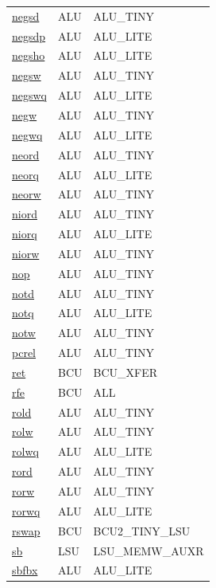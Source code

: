 \begin{small}
\begin{longtable}[l]{l l l}
\hyperlink{lvx.negsd}{negsd} & ALU & ALU\_TINY \\ 
\hyperlink{lvx.negsdp}{negsdp} & ALU & ALU\_LITE \\ 
\hyperlink{lvx.negsho}{negsho} & ALU & ALU\_LITE \\ 
\hyperlink{lvx.negsw}{negsw} & ALU & ALU\_TINY \\ 
\hyperlink{lvx.negswq}{negswq} & ALU & ALU\_LITE \\ 
\hyperlink{lvx.negw}{negw} & ALU & ALU\_TINY \\ 
\hyperlink{lvx.negwq}{negwq} & ALU & ALU\_LITE \\ 
\hyperlink{lvx.neord}{neord} & ALU & ALU\_TINY \\ 
\hyperlink{lvx.neorq}{neorq} & ALU & ALU\_LITE \\ 
\hyperlink{lvx.neorw}{neorw} & ALU & ALU\_TINY \\ 
\hyperlink{lvx.niord}{niord} & ALU & ALU\_TINY \\ 
\hyperlink{lvx.niorq}{niorq} & ALU & ALU\_LITE \\ 
\hyperlink{lvx.niorw}{niorw} & ALU & ALU\_TINY \\ 
\hyperlink{lvx.nop}{nop} & ALU & ALU\_TINY \\ 
\hyperlink{lvx.notd}{notd} & ALU & ALU\_TINY \\ 
\hyperlink{lvx.notq}{notq} & ALU & ALU\_LITE \\ 
\hyperlink{lvx.notw}{notw} & ALU & ALU\_TINY \\ 
\hyperlink{lvx.pcrel}{pcrel} & ALU & ALU\_TINY \\ 
\hyperlink{lvx.ret}{ret} & BCU & BCU\_XFER \\ 
\hyperlink{lvx.rfe}{rfe} & BCU & ALL \\ 
\hyperlink{lvx.rold}{rold} & ALU & ALU\_TINY \\ 
\hyperlink{lvx.rolw}{rolw} & ALU & ALU\_TINY \\ 
\hyperlink{lvx.rolwq}{rolwq} & ALU & ALU\_LITE \\ 
\hyperlink{lvx.rord}{rord} & ALU & ALU\_TINY \\ 
\hyperlink{lvx.rorw}{rorw} & ALU & ALU\_TINY \\ 
\hyperlink{lvx.rorwq}{rorwq} & ALU & ALU\_LITE \\ 
\hyperlink{lvx.rswap}{rswap} & BCU & BCU2\_TINY\_LSU \\ 
\hyperlink{lvx.sb}{sb} & LSU & LSU\_MEMW\_AUXR \\ 
\hyperlink{lvx.sbfbx}{sbfbx} & ALU & ALU\_LITE \\ 

\end{longtable}
\end{small}
